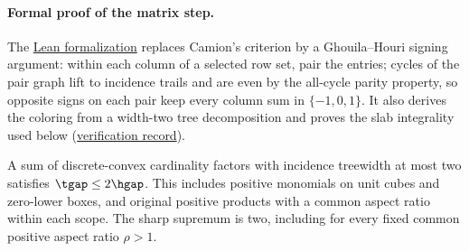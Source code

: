 \paragraph{Formal proof of the matrix step.}
The \href{../formal/topics/19-structural-multilinear/COVERAGE.md}{Lean formalization}
replaces Camion's criterion by a Ghouila--Houri signing argument: within
each column of a selected row set, pair the entries; cycles of the pair
graph lift to incidence trails and are even by the all-cycle parity
property, so opposite signs on each pair keep every column sum in
$\{-1,0,1\}$. It also derives the coloring from a width-two tree
decomposition and proves the slab integrality used below
(\href{../formal/topics/19-structural-multilinear/VERIFICATION.md}{verification record}).

\begin{theorem}\label{thm:width-two-gap}
A sum of discrete-convex cardinality factors with incidence treewidth
at most two satisfies $\tgap\le2\hgap$. This includes positive
monomials on unit cubes and zero-lower boxes, and original positive
products with a common aspect ratio within each scope. The sharp
supremum is two, including for every fixed common positive aspect ratio
$\rho>1$.
\end{theorem}
